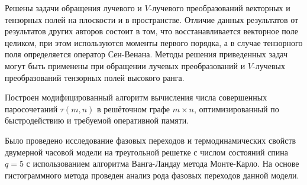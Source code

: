 Решены задачи обращения лучевого и $V$-лучевого преобразований векторных и тензорных полей на плоскости и в пространстве. Отличие данных результатов от результатов других авторов состоит в том, что восстанавливается векторное поле целиком, при этом используются моменты первого порядка, а в случае тензорного поля определяется оператор Сен-Венана.
Методы решения приведенных задач могут быть применены при обращении лучевых преобразований и $V$-лучевых преобразований тензорных полей высокого ранга.

Построен модифицированный алгоритм вычисления числа совершенных паросочетаний $\tau(m,n)$ в решёточном графе $m\times n$, оптимизированный по быстродействию и требуемой оперативной памяти.

Было проведено исследование фазовых переходов и термодинамических свойств двумерной часовой модели на треугольной решетке с числом состояний спина $q = 5$ с использованием алгоритма Ванга-Ландау метода Монте-Карло. На основе гистограммного метода проведен анализ рода фазовых переходов данной модели.  